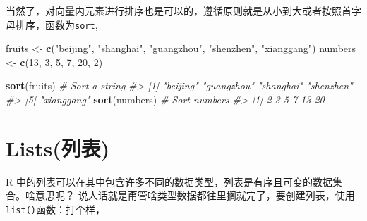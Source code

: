 \documentclass[
]{book}
\newenvironment{Shaded}{\begin{snugshade}}{\end{snugshade}}
\newcommand{\AttributeTok}[1]{\textcolor[rgb]{0.13,0.29,0.53}{#1}}
\newcommand{\CommentTok}[1]{\textcolor[rgb]{0.56,0.35,0.01}{\textit{#1}}}
\newcommand{\ConstantTok}[1]{\textcolor[rgb]{0.56,0.35,0.01}{#1}}
\newcommand{\DecValTok}[1]{\textcolor[rgb]{0.00,0.00,0.81}{#1}}
\newcommand{\FunctionTok}[1]{\textcolor[rgb]{0.13,0.29,0.53}{\textbf{#1}}}
\newcommand{\NormalTok}[1]{#1}
\newcommand{\OtherTok}[1]{\textcolor[rgb]{0.56,0.35,0.01}{#1}}
\newcommand{\StringTok}[1]{\textcolor[rgb]{0.31,0.60,0.02}{#1}}
\begin{document}
当然了，对向量内元素进行排序也是可以的，遵循原则就是从小到大或者按照首字母排序，函数为\texttt{sort},

\begin{Shaded}
\begin{Highlighting}[]
\NormalTok{fruits }\OtherTok{\textless{}{-}} \FunctionTok{c}\NormalTok{(}\StringTok{"beijing"}\NormalTok{, }\StringTok{"shanghai"}\NormalTok{, }\StringTok{"guangzhou"}\NormalTok{, }\StringTok{"shenzhen"}\NormalTok{, }\StringTok{"xianggang"}\NormalTok{)}
\NormalTok{numbers }\OtherTok{\textless{}{-}} \FunctionTok{c}\NormalTok{(}\DecValTok{13}\NormalTok{, }\DecValTok{3}\NormalTok{, }\DecValTok{5}\NormalTok{, }\DecValTok{7}\NormalTok{, }\DecValTok{20}\NormalTok{, }\DecValTok{2}\NormalTok{)}

\FunctionTok{sort}\NormalTok{(fruits)  }\CommentTok{\# Sort a string}
\CommentTok{\#\textgreater{} [1] "beijing"   "guangzhou" "shanghai"  "shenzhen" }
\CommentTok{\#\textgreater{} [5] "xianggang"}
\FunctionTok{sort}\NormalTok{(numbers) }\CommentTok{\# Sort numbers}
\CommentTok{\#\textgreater{} [1]  2  3  5  7 13 20}
\end{Highlighting}
\end{Shaded}

\hypertarget{listsux5217ux8868}{%
\section{Lists(列表)}\label{listsux5217ux8868}}

R 中的列表可以在其中包含许多不同的数据类型，列表是有序且可变的数据集合。啥意思呢？
说人话就是甭管啥类型数据都往里搁就完了，要创建列表，使用\texttt{list()}函数：打个样，

\begin{Shaded}
\end{Shaded}
\end{document}
